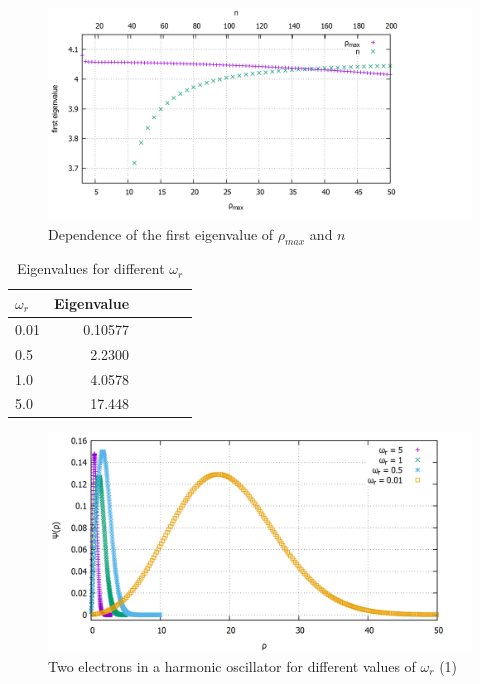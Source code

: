 \documentclass[10pt,a4paper]{article}
\begin{document}
\begin{figure}[h]
	\includegraphics[scale = 0.18]{rhomax_and_n_against_ev.png}
	\centering
	\caption{Dependence of the first eigenvalue of $\rho_{max}$ and $n$ }
	\label{eigenvaluedependence}
\end{figure}

\begin{table}[h!]
	\centering
	\begin{tabular}{|l|r|c|lrp{16cm}}\hline
		$\omega_{r}$ & Eigenvalue\\\hline
		0.01 & 0.10577\\
		0.5 & 2.2300\\
		1.0 & 4.0578\\
		5.0 & 17.448\\\hline
	\end{tabular}
	\caption{Eigenvalues for different 	$\omega_{r}$}
	\label{ev2el}
\end{table}

\begin{figure}[h]
	\includegraphics[scale = 0.25]{2Electrons_comparison_thick.png}
	\centering
	\caption{Two electrons in a harmonic oscillator for different values of $\omega_{r}$ (1) }
	\label{plot2el1}
\end{figure}
\end{document}
